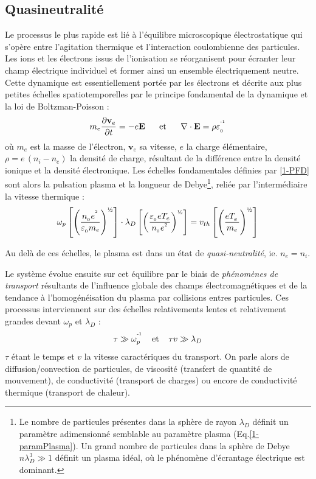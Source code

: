 		\subsection{Quasineutralité}
			Le processus le plus rapide est lié à
			l'équilibre microscopique électrostatique qui s'opère 
			entre l'agitation thermique et l'interaction coulombienne des particules. Les
			ions et les électrons issus de l'ionisation se réorganisent pour écranter
			leur champ électrique individuel et former ainsi un ensemble électriquement neutre. 
			Cette dynamique est essentiellement portée par les électrons et décrite aux plus petites
			échelles spatiotemporelles par le principe fondamental de la dynamique et la loi de Boltzman-Poisson :
			\begin{align}
			\label{1-PFD}
				m_e\frac{\partial \mathbf{v}_e}{\partial t}=-e\mathbf E
				\;\;\;\;\;\;\text{et}\;\;\;\;\;\;
				\nabla\cdot\mathbf{E}=\rho\varepsilon_{_0}^{\operatorname{^{-1}}}
			\end{align} 
			où $m_e$ est la masse de l'électron, $\mathbf{v}_e$ sa vitesse,
			$e$ la charge élémentaire, $\rho=e\,(n_i-n_e)$ la densité de charge,
			résultant de la différence entre la densité ionique et la densité électronique.
			Les échelles fondamentales définies par \ref{1-PFD} sont alors la pulsation
			plasma et la longueur de Debye\footnote{Le nombre de particules présentes
			dans la sphère de rayon $\lambda_D$ définit un paramètre adimensionné
			semblable au paramètre plasma (Eq.\ref{1-paramPlasma}). Un
			grand nombre de particules dans la sphère de Debye $n\lambda_D^3\gg1$
			définit un plasma idéal, où le phénomène d'écrantage électrique est
			dominant.}, reliée par l'intermédiaire la vitesse thermique : 
			\begin{equation}
				\omega_p\left[\left(\frac{n_{_0}e^{^2}}{\varepsilon_{_0}
				m_e}\right)^\text{\textonehalf}
				\right]\cdot\lambda_D\left[\left(\frac{\varepsilon_{_0}
				eT_e}{n_{_0}e^{^2}}\right)^\text{\textonehalf}\right]
				=v_{th}\left[\left(\frac{eT_e^{^{\phantom{1}}}}{m_e}\right)^\text{\textonehalf}\right]
			\end{equation}
		
			Au delà de ces échelles, le plasma est dans un état de \emph{quasi-neutralité}, ie. $n_e=n_i$.
			
			Le système évolue ensuite sur cet équilibre par le biais de
			\emph{phénomènes de transport} résultants de l'influence 
			globale des champs électromagnétiques et de la tendance à
			l'homogénéisation du plasma par collisions entres particules.
			Ces processus interviennent sur des échelles relativements
			lentes et relativement grandes devant $\omega_p$ et $\lambda_D$ :
			\begin{equation}
				\tau\gg \omega_p^{\operatorname{^{-1}}} \;\;\;\;\text{et}\;\;\;\;\tau v\gg\lambda_D
			\end{equation}
			$\tau$ étant le temps et $v$ la vitesse caractériques du transport.
			  On parle alors de diffusion/convection de particules, de viscosité (transfert de
			quantité de mouvement), de conductivité (transport de charges) ou encore de
			conductivité thermique (transport de chaleur). 
			
